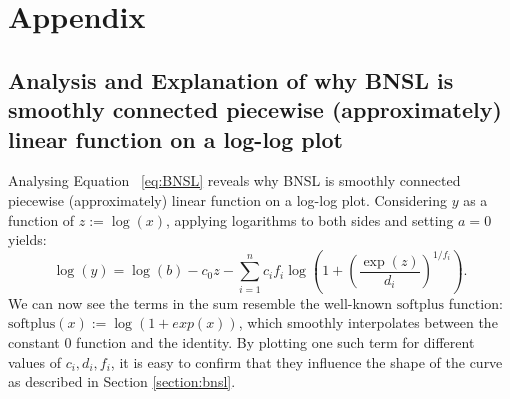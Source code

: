 \documentclass{article} %
\begin{document}

\newpage





\clearpage 
\appendix
%
\section{Appendix}


\subsection{Analysis and Explanation of why BNSL is smoothly connected piecewise (approximately) linear function on a log-log plot}
\label{section:bnsl_analysis}

Analysing Equation ~\ref{eq:BNSL} reveals why BNSL is smoothly connected piecewise (approximately) linear function on a log-log plot. %
Considering $y$ as a function of $z:=\log(x)$, applying logarithms to both sides and setting $a=0$ yields:
\begin{equation}
\log (y) =  \log (b) - c_0 z -  \sum_{i=1}^n c_i f_i \log\left(1 + \left(\frac{\exp(z)}{d_i}\right)^{1/f_i}\right).
\end{equation}
We can now see the terms in the sum resemble the well-known $\mathrm{softplus}$ function: $\mathrm{softplus}(x) := \log(1 + exp(x))$, which smoothly interpolates between the constant 0 function and the identity.
By plotting one such term for different values of $c_i, d_i, f_i$, it is easy to confirm that they influence the shape of the curve as described in Section \ref{section:bnsl}.
\end{document}
